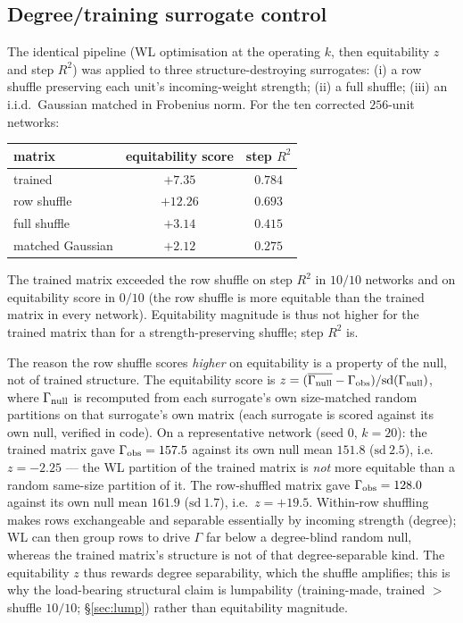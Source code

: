 \documentclass[11pt]{article}
\begin{document}
\subsection{Degree/training surrogate control}
\label{sec:surrogate}
The identical pipeline (WL optimisation at the operating $k$, then equitability $z$ and step
$R^{2}$) was applied to three structure-destroying surrogates: (i) a row shuffle preserving each
unit's incoming-weight strength; (ii) a full shuffle; (iii) an i.i.d.\ Gaussian matched in
Frobenius norm. For the ten corrected $256$-unit networks:
\begin{center}\small
\begin{tabular}{lcc}
\toprule
matrix & equitability score & step $R^{2}$ \\
\midrule
trained            & $+7.35$  & $0.784$ \\
row shuffle        & $+12.26$ & $0.693$ \\
full shuffle       & $+3.14$  & $0.415$ \\
matched Gaussian   & $+2.12$  & $0.275$ \\
\bottomrule
\end{tabular}
\end{center}
The trained matrix exceeded the row shuffle on step $R^{2}$ in $10/10$ networks and on
equitability score in $0/10$ (the row shuffle is more equitable than the trained matrix in every
network). Equitability magnitude is thus not higher for the trained matrix than for a
strength-preserving shuffle; step $R^{2}$ is.

The reason the row shuffle scores \emph{higher} on equitability is a property of the null, not of
trained structure. The equitability score is $z=(\overline{\Gamma_{\rm null}}-\Gamma_{\rm obs})/
\mathrm{sd}(\Gamma_{\rm null})$, where $\Gamma_{\rm null}$ is recomputed from each surrogate's own
size-matched random partitions on that surrogate's own matrix (each surrogate is scored against
its own null, verified in code). On a representative network (seed $0$, $k=20$): the trained
matrix gave $\Gamma_{\rm obs}=157.5$ against its own null mean $151.8$ ($\mathrm{sd}\ 2.5$),
i.e.\ $z=-2.25$ --- the WL partition of the trained matrix is \emph{not} more equitable than a
random same-size partition of it. The row-shuffled matrix gave $\Gamma_{\rm obs}=128.0$ against
its own null mean $161.9$ ($\mathrm{sd}\ 1.7$), i.e.\ $z=+19.5$. Within-row shuffling makes rows
exchangeable and separable essentially by incoming strength (degree); WL can then group rows to
drive $\Gamma$ far below a degree-blind random null, whereas the trained matrix's structure is
not of that degree-separable kind. The equitability $z$ thus rewards degree separability, which
the shuffle amplifies; this is why the load-bearing structural claim is lumpability (training-made,
trained $>$ shuffle $10/10$; \S\ref{sec:lump}) rather than equitability magnitude.
\end{document}
